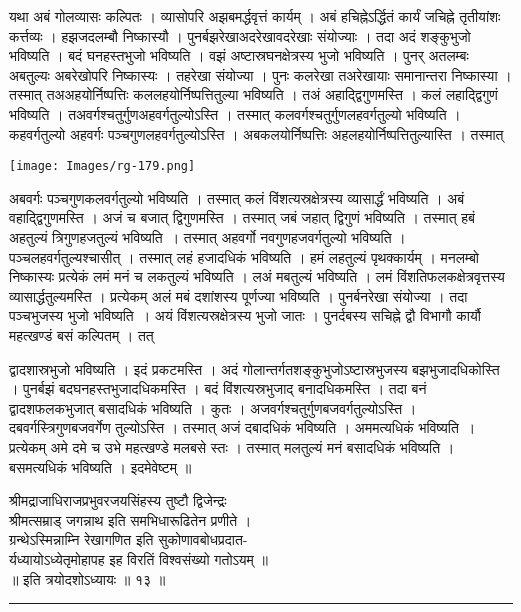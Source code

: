 \documentclass[11pt, openany]{book}
\begin{document}
\newpage
यथा अबं गोलव्यासः कल्पितः । व्यासोपरि अझबमर्द्धवृत्तं कार्यम् । अबं हचिह्नेऽर्द्धितं कार्यं जचिह्ने तृतीयांशः कर्त्तव्यः । हझजदलम्बौ निष्कास्यौ । पुनर्बझरेखाअदरेखावदरेखाः संयोज्याः । तदा अदं शङ्कुभुजो भविष्यति । बदं घनहस्तभुजो भविष्यति । वझं अष्टास्रघनक्षेत्रस्य भुजो भविष्यति । पुनर् अतलम्बः अबतुल्यः अबरेखोपरि निष्कास्यः । तहरेखा संयोज्या । पुनः कलरेखा तअरेखायाः समानान्तरा निष्कास्या । तस्मात् तअअहयोर्निष्पत्तिः कललहयोर्निष्पत्तितुल्या भविष्यति । तअं अहाद्द्विगुणमस्ति । कलं लहाद्द्विगुणं भविष्यति । तअवर्गश्चतुर्गुणअहवर्गतुल्योऽस्ति ।
तस्मात् कलवर्गश्चतुर्गुणलहवर्गतुल्यो भविष्यति । कहवर्गतुल्यो अहवर्गः पञ्चगुणलहवर्गतुल्योऽस्ति । अबकलयोर्निष्पत्तिः अहलहयोर्निष्पत्तितुल्यास्ति । तस्मात् 
\begin{center}
\texttt{[image: Images/rg-179.png]}  
\end{center} 
अबवर्गः पञ्चगुणकलवर्गतुल्यो भविष्यति । तस्मात् कलं विंशत्यस्रक्षेत्रस्य व्यासार्द्धं भविष्यति । अबं वहाद्द्विगुणमस्ति । अजं च बजात् द्विगुणमस्ति । तस्मात् जबं जहात् द्विगुणं भविष्यति । तस्मात् हबं अहतुल्यं त्रिगुणहजतुल्यं भविष्यति~। तस्मात् अहवर्गो नवगुणहजवर्गतुल्यो भविष्यति । पञ्चलहवर्गतुल्यश्चासीत् । तस्मात् लहं हजादधिकं भविष्यति । हमं लहतुल्यं पृथक्कार्यम् । मनलम्बो निष्कास्यः
प्रत्येकं लमं मनं च लकतुल्यं भविष्यति । लअं मबतुल्यं भविष्यति । लमं विंशतिफलकक्षेत्रवृत्तस्य व्यासार्द्धतुल्यमस्ति । प्रत्येकम् अलं मबं दशांशस्य पूर्णज्या भविष्यति । पुनर्बनरेखा संयोज्या ।
तदा पञ्चभुजस्य भुजो भविष्यति~। अयं विंशत्यस्रक्षेत्रस्य भुजो जातः । पुनर्दबस्य सचिह्ने द्वौ विभागौ कार्यौ महत्खण्डं बसं कल्पितम् । तत्

\newpage
\noindent द्वादशास्रभुजो भविष्यति । इदं प्रकटमस्ति । अदं गोलान्तर्गतशङ्कुभुजोऽष्टास्रभुजस्य बझभुजादधिकोस्ति । पुनर्बझं बदघनहस्तभुजादधिकमस्ति । बदं विंशत्यस्रभुजाद् बनादधिकमस्ति । तदा बनं द्वादशफलकभुजात् बसादधिकं भविष्यति । कुतः । अजवर्गश्चतुर्गुणबजवर्गतुल्योऽस्ति । दबवर्गस्त्रिगुणबजवर्गेण तुल्योऽस्ति । तस्मात् अजं दबादधिकं भविष्यति । अममत्यधिकं भविष्यति~। प्रत्येकम् अमे दमे च उभे महत्खण्डे मलबसे स्तः । तस्मात् मलतुल्यं मनं बसादधिकं भविष्यति । बसमत्यधिकं भविष्यति । इदमेवेष्टम् ॥\\

\begin{center}
{\small श्रीमद्राजाधिराजप्रभुवरजयसिंहस्य तुष्टौ द्विजेन्द्रः\\
श्रीमत्सम्राड् जगन्नाथ इति समभिधारूढितेन प्रणीते ।\\
ग्रन्थेऽस्मिन्नाम्नि रेखागणित इति सुकोणावबोधप्रदात-\\
र्यध्यायोऽध्येतृमोहापह इह विरतिं विश्वसंख्यो गतोऽयम् ॥\\

 ॥ इति त्रयोदशोऽध्यायः ॥ १३ ॥} \\
 
 \rule{0.7in}{0.3pt}
\end{center}
\end{document}
